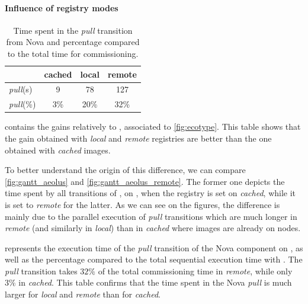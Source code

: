 
\paragraph{Influence of registry modes}

\begin{table}
  \begin{center}
    \begin{tabular}{lccc}
      \toprule
      & cached & local & remote\\
      \midrule
      \emph{pull}(s) & 9 & 78 & 127\\
      \emph{pull}(\%) & 3\% & 20\% & 32\%\\
      \bottomrule
    \end{tabular}
    \caption{Time spent in the \emph{pull} transition from Nova and
    percentage compared to the total time for \ansass commissioning.}
    \label{tab:pull}
  \end{center}
\end{table}

 contains the gains relatively to \ansass,
associated to \cref{fig:ecotype}. This table shows that the gain obtained with
\emph{local} and \emph{remote} registries are better than the one obtained with
\emph{cached} \docker images.

To better understand the origin of this difference, we can compare
\cref{fig:gantt_aeolus} and \cref{fig:gantt_aeolus_remote}. The former one
depicts the time spent by all transitions of \aeoass, on \ecotype, when the
\docker registry is set on \emph{cached}, while it is set to \emph{remote} for
the latter.
As we can see on the figures, the difference is mainly due to the parallel
execution of \emph{pull} transitions which are much longer in \emph{remote}
(and similarly in \emph{local}) than in \emph{cached} where images are already
on nodes.

 represents the execution time of the \emph{pull} transition of
the Nova component on \ecotype, as well as the percentage compared to the total
sequential execution time with \ansass. The \emph{pull} transition takes $32\%$
of the total commissioning time in \emph{remote}, while only $3\%$ in
\emph{cached}. This table confirms that the time spent in the Nova \emph{pull}
is much larger for \emph{local} and \emph{remote} than for
\emph{cached}.

